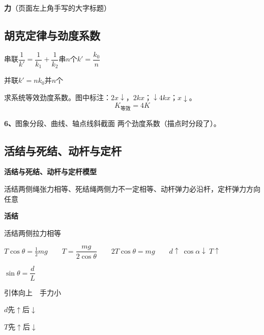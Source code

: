 \textbf{力}\quad（页面左上角手写的大字标题）

\subsection{胡克定律与劲度系数}
\begin{keybox}
串联\quad $\dfrac{1}{k'}=\dfrac{1}{k_1}+\dfrac{1}{k_2}$\qquad 串$n$个\quad $k'=\dfrac{k_0}{n}$

并联\quad $k'=nk_0$\quad 并$n$个
\end{keybox}

求系统等效劲度系数。图中标注：$2x\downarrow$，$2kx$；$\downarrow4kx$；$x\downarrow$。
\[
K_{\text{等效}}=4K
\]

\textbf{6、}图象分段、曲线、轴点线斜截面
两个劲度系数（描点时分段了）。

\subsection{活结与死结、动杆与定杆}
\textbf{活结与死结、动杆与定杆模型}

活结两侧绳张力相等、死结绳两侧力不一定相等、动杆弹力必沿杆，定杆弹力方向任意

\textbf{活结}


活结两侧拉力相等


$T\cos\theta=\frac12 mg$　　$T=\dfrac{mg}{2\cos\theta}$　　$2T\cos\theta=mg$　　$d\uparrow\ \cos\alpha\downarrow\ T\uparrow$ %

$\sin\theta=\dfrac{d}{L}$


引体向上　手力小


$d$先$\uparrow$后$\downarrow$

$T$先$\uparrow$后$\downarrow$

